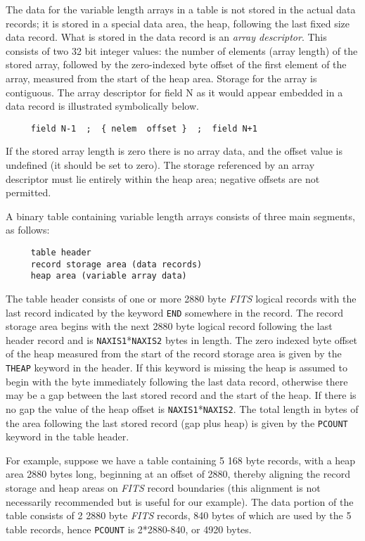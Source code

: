 The data for the variable length arrays in a table is not stored in the
actual data records; it is stored in a special data area, the heap, 
following the last fixed size data record.  What is stored in the data
record is an {\it array descriptor}.  This consists of two 32 bit integer
values: the number of elements (array length) of the stored array, followed
by the zero-indexed byte offset of the first element of the array, measured
from the start of the heap area.  Storage for the array is contiguous.  The
array descriptor for field N as it would appear embedded in a data record
is
illustrated symbolically below.

\begin{verbatim}
     field N-1  ;  { nelem  offset }  ;  field N+1 \end{verbatim}
If the stored array length is zero there is no array data, and the offset
value is undefined (it should be set to zero).  The storage referenced by an
array descriptor must lie entirely within the heap area; negative offsets
are not permitted.

A binary table containing variable length arrays consists of three main
segments, as follows:

\begin{verbatim}
     table header
     record storage area (data records)
     heap area (variable array data)
\end{verbatim}

The table header consists of one or more 2880 byte 
{\em FITS\/} logical records with the last record 
indicated by the keyword {\tt END} somewhere in the record.  The
record storage area begins with the next 2880 byte logical record following
the last header record and is {\tt NAXIS1}*{\tt NAXIS2} 
bytes in length.  
The zero indexed byte offset of the heap measured from 
the start of the record storage area is given by 
the {\tt THEAP} keyword in the header.  If this keyword
is missing the heap is assumed to begin with the byte immediately following
the last data record, otherwise there may be a gap between the last stored
record and the start of the heap.  If there is no gap the value of the heap
offset is {\tt NAXIS1}*{\tt NAXIS2}.  The total length 
in bytes of the area following the last stored record (gap plus heap) 
is given by the {\tt PCOUNT} keyword in the
table header.

For example, suppose we have a table containing 5 168 byte records, with
a
heap area 2880 bytes long, beginning at an offset of 2880, thereby aligning
the record storage and heap areas on {\em FITS\/} record boundaries 
(this alignment is not necessarily recommended but is useful for our
example).  The data
portion of the table consists of 2 2880 byte {\em FITS\/} records, 840 bytes
of
which are used by the 5 table records, 
hence {\tt PCOUNT} is 2*2880-840, or 4920 bytes.


